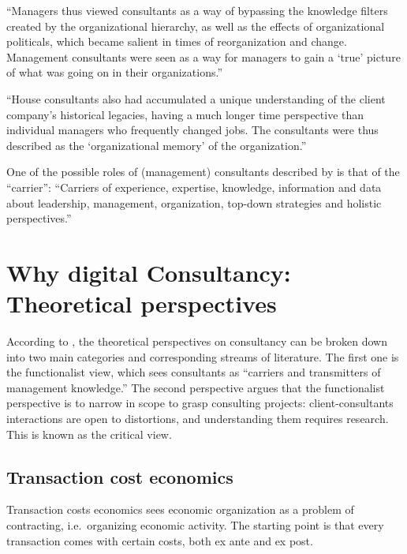 \documentclass[12pt]{article}
\begin{document}
``Managers thus viewed consultants as a way of bypassing the knowledge
filters created by the organizational hierarchy, as well as the effects
of organizational politicals, which became salient in times of
reorganization and change. Management consultants were seen as a way for
managers to gain a `true' picture of what was going on in their
organizations.'' \citep[ 54]{werr2002}

``House consultants also had accumulated a unique understanding of the
client company's historical legacies, having a much longer time
perspective than individual managers who frequently changed jobs. The
consultants were thus described as the `organizational memory' of the
organization.''

One of the possible roles of (management) consultants described by
\citet[269]{furusten2009} is that of the ``carrier'': ``Carriers of
experience, expertise, knowledge, information and data about leadership,
management, organization, top-down strategies and holistic
perspectives.''

\hypertarget{why-digital-consultancy-theoretical-perspectives}{%
\section{Why digital Consultancy: Theoretical
perspectives}\label{why-digital-consultancy-theoretical-perspectives}}

According to \citet[3-6]{armbruster2006}, the theoretical perspectives
on consultancy can be broken down into two main categories and
corresponding streams of literature. The first one is the functionalist
view, which sees consultants as ``carriers and transmitters of
management knowledge.'' The second perspective argues that the
functionalist perspective is to narrow in scope to grasp consulting
projects: client-consultants interactions are open to distortions, and
understanding them requires research. This is known as the critical
view.

\hypertarget{transaction-cost-economics}{%
\subsection{Transaction cost
economics}\label{transaction-cost-economics}}

Transaction costs economics sees economic organization as a problem of
contracting, i.e.~organizing economic activity. The starting point is
that every transaction comes with certain costs, both ex ante and ex
post.
\end{document}
